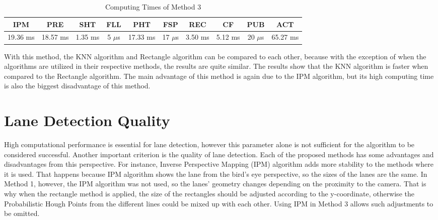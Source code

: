 \begin{table}[ht]
\caption{Computing Times of Method 3} 
\centering 
  \begin{tabular}{ | c | c | c | c | c | c | c | c | c | c |}
    \hline
  
  IPM 		& PRE 		& SHT	   & FLL 	   & PHT 	   & FSP 	    & REC 	   & CF 	  & PUB 	& ACT \\ \hline  
  19.36 ms & 18.57 ms & 1.35 ms & 5 $\mu$s & 17.33 ms & 17 $\mu$s & 3.50 ms & 5.12 ms & 20 $\mu$s       & 65.27 ms   \\ \hline  
    
    
      \end{tabular}
  \label{tab:Case3_Times}
\end{table}

With this method, the KNN algorithm and Rectangle algorithm can be compared to each other, because with the exception of when the algorithms are utilized in their respective methods, the results are quite similar. The results show that the KNN algorithm is faster when compared to the Rectangle algorithm. The main advantage of this method is again due to the IPM algorithm, but its high computing time is also the biggest disadvantage of this method.





\section{Lane Detection Quality}\label{sec:Lane Detection Quality}

High computational performance is essential for lane detection, however this parameter alone is not sufficient for the algorithm to be considered successful. Another important criterion is the quality of lane detection. Each of the proposed methods has some advantages and disadvantages from this perspective. For instance, Inverse Perspective Mapping (IPM) algorithm adds more stability to the methods where it is used. That happens because IPM algorithm shows the lane from the bird's eye perspective, so the sizes of the lanes are the same. In Method 1, however, the IPM algorithm was not used, so the lanes' geometry changes depending on the proximity to the camera. That is why when the rectangle method is applied, the size of the rectangles should be adjusted according to the y-coordinate, otherwise the Probabilistic Hough Points from the different lines could be mixed up with each other. Using IPM in Method 3 allows such adjustments to be omitted.

